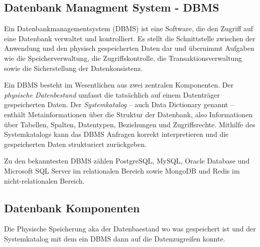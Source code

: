 \subsection{Datenbank Managment System - DBMS}

Ein Datenbankmanagementsystem (DBMS) ist eine Software, die den Zugriff auf eine
Datenbank verwaltet und kontrolliert. Es stellt die Schnittstelle zwischen der
Anwendung und den physisch gespeicherten Daten dar und übernimmt Aufgaben wie
die Speicherverwaltung, die Zugriffskontrolle, die Transaktionsverwaltung sowie
die Sicherstellung der Datenkonsistenz.

Ein DBMS besteht im Wesentlichen aus zwei zentralen Komponenten. Der
\textit{physische Datenbestand} umfasst die tatsächlich auf einem Datenträger
gespeicherten Daten. Der \textit{Systemkatalog} -- auch Data Dictionary genannt
-- enthält Metainformationen über die Struktur der Datenbank, also Informationen
über Tabellen, Spalten, Datentypen, Beziehungen und Zugriffsrechte. Mithilfe des
Systemkatalogs kann das DBMS Anfragen korrekt interpretieren und die gespeicherten
Daten strukturiert zurückgeben.

Zu den bekanntesten DBMS zählen PostgreSQL, MySQL, Oracle Database und
Microsoft SQL Server im relationalen Bereich sowie MongoDB und Redis im
nicht-relationalen Bereich.

\subsection{Datenbank Komponenten}
Die Physische Speicherung aka der Datenbaestand wo was gespeichert ist und der Systemkatalog mit dem 
ein DBMS dann auf die Datenzugreifen konnte.
